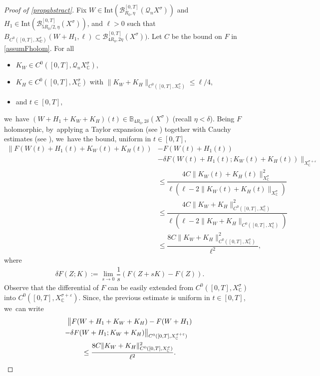 \documentclass[JEP,XML,SOM,Unicode,published]{cedram}
\theoremstyle{definition}
\let\mc\mathcal
\let\veps\varepsilon
\newcommand{\B}{\mc{B}}
\newcommand{\C}{\boldsymbol{C}}
\newcommand{\Q}{\mathcal{Q}}
\providecommand{\norm}[1]{\lVert#1\rVert}
\begin{document}
\begin{proof}[Proof of \cref{propabstract}]
Fix $W\in \text{Int}(\B_{R_0, \eta}^{[0, T]}(\Q_nX^\sigma))$ and $H_1\in \text{Int}(\B_{5R_0/2, \eta}^{[0, T]}(X^\sigma))$, and $\ell>0$ such that $B_{C^0([0,T],X_{\C}^\sigma)}(W+H_1,\ell)\subset \B_{4R_0, 2\eta}^{[0, T]}(X^\sigma))$. Let $C$ be the bound on $F$ in \cref{assumFholom}. For all
\begin{itemize}
\item
$K_W\in C^0([0, T], \Q_n X_\mathbb{C}^\sigma)$,
\item
$K_H\in C^0([0, T], X_\mathbb{C}^\sigma)$ with $\norm{K_W+K_H}_{C^0([0, T], X_\mathbb{C}^\sigma)}\leq \ell/4$,
\item
and $t\in [0,T]$,
\end{itemize}
we~have $(W+H_1+K_W+K_H)(t) \in \mathbb{B}_{4R_{0},2\delta}(X^{\sigma})$ (recall $\eta<\delta$). Being $F$ holomorphic, by~applying a Taylor expansion (see \cite[Th.\,7.1, Cor.\,7.3]{Muj86}) together with Cauchy estimates (see \cite[Cor.\,7.4]{Muj86}), we~have the bound, uniform in $t\in [0,T]$,
\begin{align*}
\lVert F(W(t)+H_1(t)+K_W(t)+K_H(t))&-F(W(t)+H_1(t))\\
&-\delta F(W(t)+H_1(t); K_W(t)+K_H(t)) \rVert_{ X_\mathbb{C}^{\sigma+\veps}}\\
&\leq \dfrac{4C\norm{K_W(t)+K_H(t)}_{X_\mathbb{C}^\sigma}^2}{\ell(\ell-2\norm{K_W(t)+K_H(t)}_{X_\mathbb{C}^\sigma})} \\
&\leq \dfrac{4C\norm{K_W+K_H}_{C^0([0, T], X_\mathbb{C}^\sigma)}^2}{\ell(\ell-2\norm{K_W+K_H}_{C^0([0, T], X_\mathbb{C}^\sigma)})}\\
&\leq \dfrac{8C\norm{K_W+K_H}_{C^0([0, T], X_\mathbb{C}^\sigma)}^2}{\ell^2},
\end{align*}
where
\begin{align*}
\delta F(Z; K):=\lim_{s\to 0}\dfrac{1}{s}(F(Z+sK)-F(Z)).
\end{align*}
Observe that the differential of $F$ can be easily extended from $C^0([0, T], X_\mathbb{C}^\sigma)$ into $C^0([0, T], X_\mathbb{C}^{\sigma+\veps})$. Since, the previous estimate is uniform in $t\in [0,T]$, we~can write
\begin{multline}
\bigl\Vert F(W+H_1+K_W+K_H)-F(W+H_1)\\
\shoveright{-\delta F(W+H_1; K_W+K_H)\bigr\Vert_{C^0([0, T], X_\mathbb{C}^{\sigma+\veps})}}\\
\leq \dfrac{8C\norm{K_W+K_H}_{C^0([0, T], X_\mathbb{C}^\sigma)}^2}{\ell^2}.\label{prop:proof:frechet-1}
\end{multline}


\end{proof}
\end{document}
